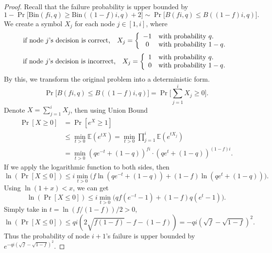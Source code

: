 \documentclass[a4paper,UKenglish]{lipics}
\theoremstyle{definition}
\newcommand\E{\mathbb{E}}
\begin{document}
\begin{proof}
Recall that the failure probability is upper bounded by
\begin{equation*}
	1 - \Pr \Big[ 
		\text{Bin}(fi, q) \ge \text{Bin}((1-f)i, q) + 2
	\Big ]
\sim
	\Pr \Big[ 
		B(fi, q) \le B((1-f)i, q)
	\Big ].
\end{equation*}
We create a symbol $X_j$ for each node $j \in [1, i]$, where
\begin{equation*}
\text{if node $j$'s decision is correct, }~~
	X_j =
	\left \{
	\begin{array} {c l}
		-1 & \text{with probability $q$.} \\
		0 & \text{with probability $1-q$.}
	\end{array}
	\right.
\end{equation*}
\begin{equation*}
\text{if node $j$'s decision is incorrect, }~~
	X_j =
	\left \{
	\begin{array} {c l}
		1 & \text{with probability $q$.} \\
		0 & \text{with probability $1-q$.}
	\end{array}
	\right.
\end{equation*}
By this, we transform the original problem into a deterministic form.
\begin{equation*}
	\Pr \Big[ 
		B(fi, q) \le B((1-f)i, q)
	\Big]
=
	\Pr\Big[
		\sum_{j=1}^i X_j \ge 0
	\Big].
\end{equation*}
Denote $X = \sum_{j=1}^i X_j$, then using Union Bound
\begin{align*}
	\Pr[X \ge 0]
& =
	\Pr[e^{X} \ge 1 ] \\
& \le
	\min_{t>0} \E(e^{tX})
	=
	\min_{t>0}\prod_{j = 1}^{i}\E(e^{tX_j})  \\
& =
	\min_{t > 0} (qe^{-t} + (1-q))^{fi}\cdot (qe^{t} + (1-q))^{(1-f)i}.
\end{align*}
If we apply the logarithmic function to both sides, then
\begin{equation*}
	\ln (\Pr[X \le 0])
\le
	i\min_{t>0} \Big( f \ln(qe^{-t} + (1-q)) + (1-f)\ln (qe^{t} + (1-q)) \Big).
\end{equation*}
Using $\ln(1+x) < x$, we can get
\begin{equation*}
	\ln (\Pr[X \le 0])
\le
	i\min_{t>0} \Big( qf(e^{-t} - 1) + (1-f)q(e^{t} - 1) \Big).
\end{equation*}
Simply take in $t = \ln (f/(1-f)) / 2 > 0$,
\begin{equation*}
	\ln (\Pr[X \le 0])
\le
	qi (2\sqrt{f(1-f)} - f - (1-f))
=
	-qi(\sqrt{f} - \sqrt{1-f})^2.
\end{equation*}
Thus the probability of node $i+1$'s failure is upper bounded by $e^{-qi(\sqrt{f} - \sqrt{1-f})^2}.$
\end{proof}
\end{document}
